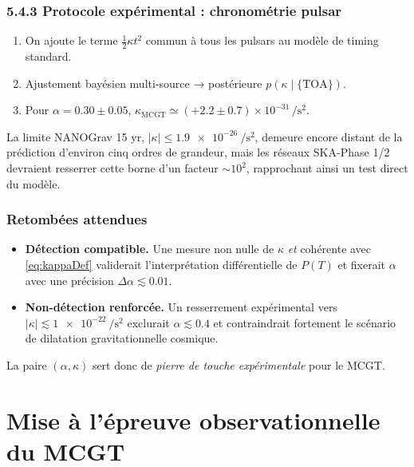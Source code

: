 \documentclass[11pt]{article}
\begin{document}
\subsubsection*{5.4.3 Protocole expérimental : chronométrie pulsar}

\begin{enumerate}
  \item On ajoute le terme \(\tfrac12\kappa t^{2}\) commun à tous les pulsars
        au modèle de timing standard.
  \item Ajustement bayésien multi-source →
        postérieure \(p(\kappa\mid\{\text{TOA}\})\).
  \item Pour \(\alpha=0.30\pm0.05\),
        \(\kappa_{\text{MCGT}}\simeq(+2.2\pm0.7)
        \times10^{-31}\,\si{\per\square\second}\).
\end{enumerate}

La limite NANOGrav 15 yr,
\( |\kappa|\le\SI{1.9e-26}{\per\square\second} \),
demeure encore distant de la prédiction d’environ cinq ordres de
grandeur, mais les réseaux \textsc{SKA}-Phase 1/2 devraient resserrer
cette borne d’un facteur \(\sim10^{2}\), rapprochant ainsi un test direct
du modèle.

\subsubsection{Retombées attendues}

\begin{itemize}
  \item \textbf{Détection compatible.}  
        Une mesure non nulle de \(\kappa\) \emph{et} cohérente avec
        \eqref{eq:kappaDef} validerait l’interprétation différentielle
        de \(P(T)\) et fixerait \(\alpha\) avec une précision
        \(\Delta\alpha\lesssim0.01\).
  \item \textbf{Non-détection renforcée.}  
        Un resserrement expérimental vers
        \(\lvert\kappa\rvert\lesssim\SI{1e-22}{\per\square\second}\)
        exclurait \(\alpha\lesssim0.4\) et contraindrait fortement
        le scénario de dilatation gravitationnelle cosmique.
\end{itemize}

La paire \((\alpha,\kappa)\) sert donc de
\emph{pierre de touche expérimentale} pour le MCGT.

\section{Mise à l’épreuve observationnelle du MCGT}
\end{document}
